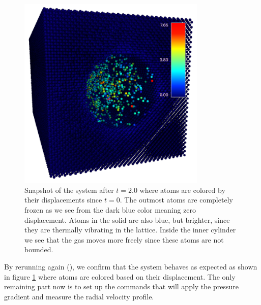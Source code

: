 \documentclass[12pt,a4paper,final]{iopart}
\begin{document}
\begin{figure}
	\centering
	\includegraphics[width=0.8\textwidth]{lj_flow/07_moving.png}
	\caption{
		Snapshot of the system after $t=2.0$ where atoms are colored by their displacements since $t=0$.
		The outmost atoms are completely frozen as we see from the dark blue color meaning zero displacement.
		Atoms in the solid are also blue, but brighter, since they are thermally vibrating in the lattice.
		Inside the inner cylinder we see that the gas moves more freely since these atoms are not bounded.
	}
	\label{fig:moving_atoms}
\end{figure}

By rerunning again (), we confirm that the system behaves as expected as shown in figure \ref{fig:moving_atoms} where
atoms are colored based on their displacement.
The only remaining part now is to set up the commands that will apply the pressure gradient and measure the radial velocity profile.
\end{document}
